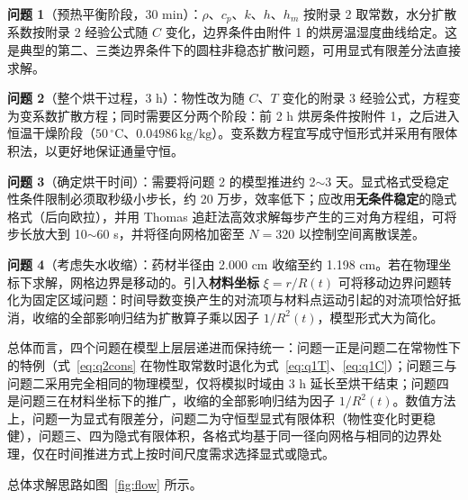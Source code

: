 \documentclass[withoutpreface,bwprint]{cumcmthesis} %
\begin{document}
\textbf{问题 1}（预热平衡阶段，30 min）：$\rho$、$c_p$、$k$、$h$、$h_m$ 按附录 2 取常数，水分扩散系数按附录 2 经验公式随 $C$ 变化，边界条件由附件 1 的烘房温湿度曲线给定。这是典型的第二、三类边界条件下的圆柱非稳态扩散问题，可用显式有限差分法直接求解。

\textbf{问题 2}（整个烘干过程，3 h）：物性改为随 $C$、$T$ 变化的附录 3 经验公式，方程变为变系数扩散方程；同时需要区分两个阶段：前 2 h 烘房条件按附件 1，之后进入恒温干燥阶段（$50\,{}^\circ$C、$0.04986\,\mathrm{kg/kg}$）。变系数方程宜写成守恒形式并采用有限体积法，以更好地保证通量守恒。

\textbf{问题 3}（确定烘干时间）：需要将问题 2 的模型推进约 2$\sim$3 天。显式格式受稳定性条件限制必须取秒级小步长，约 20 万步，效率低下；应改用\textbf{无条件稳定}的隐式格式（后向欧拉），并用 Thomas 追赶法高效求解每步产生的三对角方程组，可将步长放大到 10$\sim$60 s，并将径向网格加密至 $N=320$ 以控制空间离散误差。

\textbf{问题 4}（考虑失水收缩）：药材半径由 2.000 cm 收缩至约 1.198 cm。若在物理坐标下求解，网格边界是移动的。引入\textbf{材料坐标} $\xi=r/R(t)$ 可将移动边界问题转化为固定区域问题：时间导数变换产生的对流项与材料点运动引起的对流项恰好抵消，收缩的全部影响归结为扩散算子乘以因子 $1/R^2(t)$，模型形式大为简化。

总体而言，四个问题在模型上层层递进而保持统一：问题一正是问题二在常物性下的特例（式~\eqref{eq:q2cons} 在物性取常数时退化为式~\eqref{eq:q1T}、\eqref{eq:q1C}）；问题三与问题二采用完全相同的物理模型，仅将模拟时域由 3 h 延长至烘干结束；问题四是问题三在材料坐标下的推广，收缩的全部影响归结为因子 $1/R^2(t)$。数值方法上，问题一为显式有限差分，问题二为守恒型显式有限体积（物性变化时更稳健），问题三、四为隐式有限体积，各格式均基于同一径向网格与相同的边界处理，仅在时间推进方式上按时间尺度需求选择显式或隐式。

总体求解思路如图~\ref{fig:flow} 所示。
\end{document}
